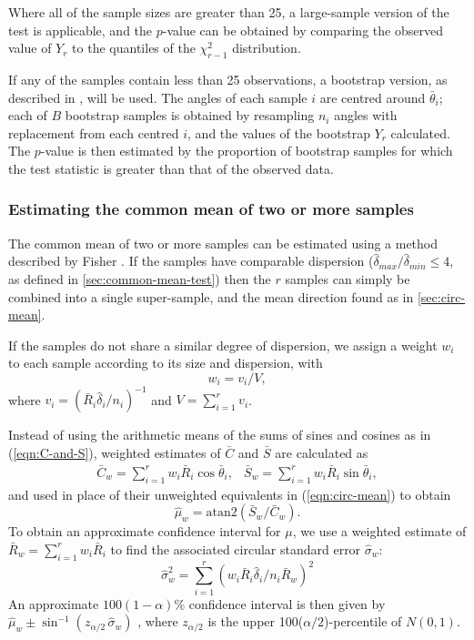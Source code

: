 \documentclass[../../ArchStats.tex]{subfiles}
\begin{document}
Where all of the sample sizes are greater than 25, a large-sample version of the test is applicable, and the $p$-value can be obtained by comparing the observed value of  $Y_r$ to the quantiles of the $\chi^2_{r-1}$ distribution. 

If any of the samples contain less than 25 observations, a bootstrap version, as described in \cite[section 8.4.4]{Fisher1993}, will be used. The angles of each sample $i$ are centred around $\bar{\theta}_i$; each of $B$ bootstrap samples is obtained by resampling $n_i$ angles with replacement from each centred $i$, and the values of the bootstrap $Y_r$ calculated. The $p$-value is then estimated by the proportion of bootstrap samples for which the test statistic is greater than that of the observed data.

\subsubsection{Estimating the common mean of two or more samples}
\label{sec:est-pooled-mean}

The common mean of two or more samples can be estimated using a method described by Fisher \cite[section 5.3.5]{Fisher1993}. If the samples have comparable dispersion ($\hat{\delta}_{max} / \hat{\delta}_{min} \leq 4$, as defined in \ref{sec:common-mean-test}) then the $r$ samples can simply be combined into a single super-sample, and the mean direction found as in \ref{sec:circ-mean}.

If the samples do not share a similar degree of dispersion, we assign a weight $w_i$ to each sample according to its size and dispersion, with
\begin{equation}
w_i = v_i/V,
\end{equation}
where $v_i = (\bar{R}_i \hat{\delta}_i / n_i)^{-1}$ and $V = \sum_{i=1}^r v_i$.

Instead of using the arithmetic means of the sums of sines and cosines as in (\ref{eqn:C-and-S}), weighted estimates of $\bar{C}$ and $\bar{S}$ are calculated as
	\begin{equation}
	\begin{matrix*}
	\bar{C}_w = \sum_{i=1}^r w_i \bar{R}_i \cos \bar{\theta}_i, & 
	\bar{S}_w = \sum_{i=1}^r w_i \bar{R}_i \sin \bar{\theta}_i,
	\end{matrix*}
	\end{equation}
and used in place of their unweighted equivalents in (\ref{eqn:circ-mean}) to obtain
\begin{equation}\hat{\mu}_w = \text{atan2}(\bar{S}_w/\bar{C}_w).\end{equation}
To obtain an approximate confidence interval for $\mu$, we use a weighted estimate of $\bar{R}_w = \sum_{i=1}^r w_i \bar{R}_i$ to find the associated circular standard error $\hat{\sigma}_w$:
	\begin{equation}
 	\hat{\sigma}_w^2 = \sum_{i=1}^r \left( w_i \bar{R}_i \hat{\delta}_i / n_i \bar{R}_w \right) ^2
	\end{equation}
An approximate $100(1-\alpha)$\% confidence interval is then given by
 $ \hat{\mu}_w \pm \sin^{-1}(z_{\alpha/2} \, \hat{\sigma}_w)$ ,
where $z_{\alpha/2}$ is the upper 100($\alpha/2$)-percentile of $N(0,1)$.
\end{document}
